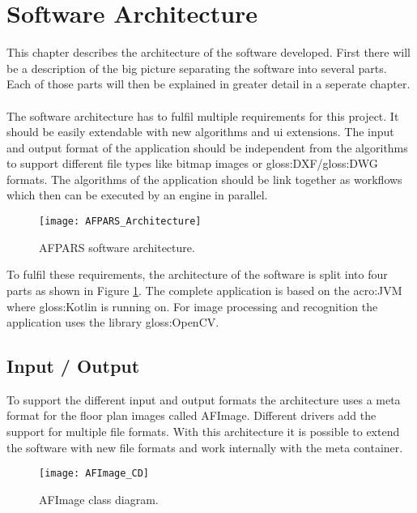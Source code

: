 \section{Software Architecture}
This chapter describes the architecture of the software developed. First there will be a description of the big picture separating the software into several parts. Each of those parts will then be explained in greater detail in a seperate chapter.
\\\\
The software architecture has to fulfil multiple requirements for this project. It should be easily extendable with new algorithms and ui extensions. The input and output format of the application should be independent from the algorithms to support different file types like bitmap images or \gls{gloss:DXF}/\gls{gloss:DWG} formats. The algorithms of the application should be link together as workflows which then can be executed by an engine in parallel.

\begin{figure}[h]
  \centering
      \texttt{[image: AFPARS\_Architecture]}
  \caption{AFPARS software architecture.}
  \label{fig:AFPARS_Architecture}
\end{figure}


To fulfil these requirements, the architecture of the software is split into four parts as shown in Figure \ref{fig:AFPARS_Architecture}. The complete application is based on the \acrfull{acro:JVM} where \gls{gloss:Kotlin} is running on. For image processing and recognition the application uses the library \gls{gloss:OpenCV}.


\pagebreak

\subsection{Input / Output}
To support the different input and output formats the architecture uses a meta format for the
floor plan images called AFImage. Different drivers add the support for multiple file formats. With this architecture it is possible to extend the software with new file formats and work internally with the meta container.

\begin{figure}[h]
  \centering
      \texttt{[image: AFImage\_CD]}
  \caption{AFImage class diagram.}
  \label{fig:AFImage_CD}
\end{figure}

